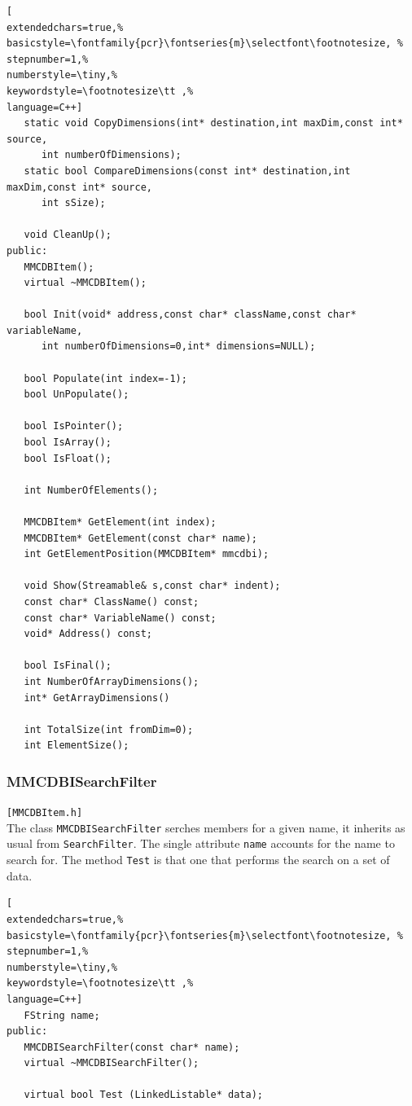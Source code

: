 \begin{lstlisting}[
extendedchars=true,%
basicstyle=\fontfamily{pcr}\fontseries{m}\selectfont\footnotesize, %
stepnumber=1,%
numberstyle=\tiny,%
keywordstyle=\footnotesize\tt ,%
language=C++]
   static void CopyDimensions(int* destination,int maxDim,const int* source,
      int numberOfDimensions);
   static bool CompareDimensions(const int* destination,int maxDim,const int* source,
      int sSize);

   void CleanUp();
public:
   MMCDBItem();
   virtual ~MMCDBItem();

   bool Init(void* address,const char* className,const char* variableName,
      int numberOfDimensions=0,int* dimensions=NULL);

   bool Populate(int index=-1);
   bool UnPopulate();

   bool IsPointer();
   bool IsArray();
   bool IsFloat();

   int NumberOfElements();

   MMCDBItem* GetElement(int index);
   MMCDBItem* GetElement(const char* name);
   int GetElementPosition(MMCDBItem* mmcdbi);

   void Show(Streamable& s,const char* indent);
   const char* ClassName() const;
   const char* VariableName() const;
   void* Address() const;

   bool IsFinal();
   int NumberOfArrayDimensions();
   int* GetArrayDimensions()

   int TotalSize(int fromDim=0);
   int ElementSize();
\end{lstlisting}



\subsubsection{MMCDBISearchFilter}
\texttt{[MMCDBItem.h]}\\
The class \texttt{MMCDBISearchFilter} serches members for a given name, it inherits as usual from \texttt{SearchFilter}. The single attribute \texttt{name} accounts for the name to search for. The method \texttt{Test} is that one that performs the search on a set of data.

\begin{lstlisting}[
extendedchars=true,%
basicstyle=\fontfamily{pcr}\fontseries{m}\selectfont\footnotesize, %
stepnumber=1,%
numberstyle=\tiny,%
keywordstyle=\footnotesize\tt ,%
language=C++]
   FString name;
public:
   MMCDBISearchFilter(const char* name);
   virtual ~MMCDBISearchFilter();

   virtual bool Test (LinkedListable* data);
\end{lstlisting}



